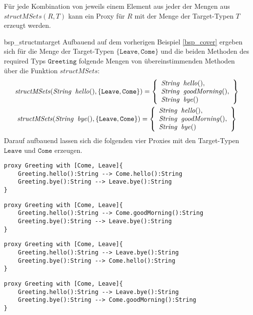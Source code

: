 \noindent
Für jede Kombination von jeweils einem Element aus jeder der Mengen aus $\mathit{structMSets(R,T)}$ kann ein Proxy für $R$ mit der Menge der Target-Typen $T$ erzeugt werden.

\begin{example}{bsp_structmtarget}
Aufbauend auf dem vorherigen Beispiel \ref{bsp_cover} ergeben sich für die Menge der Target-Typen  $\{\texttt{Leave}, \texttt{Come}\}$ und die beiden Methoden des required Typs $\texttt{Greeting}$ folgende Mengen von übereinstimmenden Methoden über die Funktion $\mathit{structMSets}$:
\begin{gather*}
\mathit{structMSets(\mathit{String}\texttt{ }\mathit{hello()},\{\texttt{Leave}, \texttt{Come}\})} = 
\left\{
\begin{array}{l}
\mathit{String}\texttt{ }\mathit{hello()},\\
\mathit{String}\texttt{ }\mathit{goodMorning()},\\
\mathit{String}\texttt{ }\mathit{bye()}
\end{array}
\right\}\\
\mathit{structMSets(\mathit{String}\texttt{ }\mathit{bye()},\{\texttt{Leave}, \texttt{Come}\})} = 
\left\{
\begin{array}{l}
\mathit{String}\texttt{ }\mathit{hello()},\\
\mathit{String}\texttt{ }\mathit{goodMorning()},\\
\mathit{String}\texttt{ }\mathit{bye()}
\end{array}
\right\}
\end{gather*}
\noindent
Darauf aufbauend lassen sich die folgenden vier Proxies mit den Target-Typen $\texttt{Leave}$ und $\texttt{Come}$ erzeugen.
\begin{lstlisting}[style = dsl]
proxy Greeting with [Come, Leave]{
	Greeting.hello():String --> Come.hello():String
	Greeting.bye():String --> Leave.bye():String
}
\end{lstlisting}
\begin{lstlisting}[style = dsl]
proxy Greeting with [Come, Leave]{
	Greeting.hello():String --> Come.goodMorning():String
	Greeting.bye():String --> Leave.bye():String
}
\end{lstlisting}
\begin{lstlisting}[style = dsl]
proxy Greeting with [Come, Leave]{
	Greeting.hello():String --> Leave.bye():String
	Greeting.bye():String --> Come.hello():String
}
\end{lstlisting}
\begin{lstlisting}[style = dsl]
proxy Greeting with [Come, Leave]{
	Greeting.hello():String --> Leave.bye():String
	Greeting.bye():String --> Come.goodMorning():String
}
\end{lstlisting}
\end{example}
